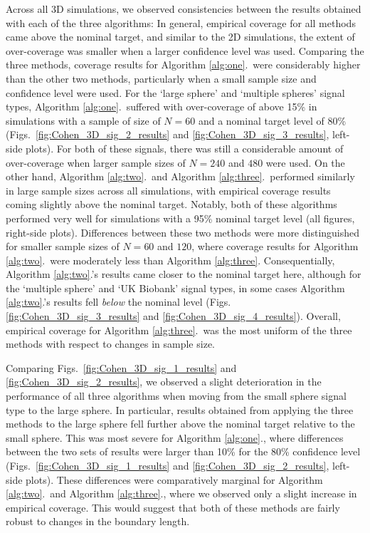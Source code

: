 Across all 3D simulations, we observed consistencies between the results obtained with each of the three algorithms: In general, empirical coverage for all methods came above the nominal target, and similar to the 2D simulations, the extent of over-coverage was smaller when a larger confidence level was used. Comparing the three methods, coverage results for Algorithm \ref{alg:one}.\ were considerably higher than the other two methods, particularly when a small sample size and confidence level were used. For the `large sphere' and `multiple spheres' signal types, Algorithm \ref{alg:one}.\ suffered with over-coverage of above 15\% in simulations with a sample of size of $N = 60$ and a nominal target level of 80\% (Figs.\ \ref{fig:Cohen_3D_sig_2_results} and \ref{fig:Cohen_3D_sig_3_results}, left-side plots). For both of these signals, there was still a considerable amount of over-coverage when larger sample sizes of $N = 240$ and $480$ were used. On the other hand, Algorithm \ref{alg:two}.\ and Algorithm \ref{alg:three}.\ performed similarly in large sample sizes across all simulations, with empirical coverage results coming slightly above the nominal target. Notably, both of these algorithms performed very well for simulations with a 95\% nominal target level (all figures, right-side plots).
Differences between these two methods were more distinguished for smaller sample sizes of $N = 60$ and $120$, where coverage results for Algorithm \ref{alg:two}.\ were moderately less than Algorithm \ref{alg:three}. Consequentially, Algorithm \ref{alg:two}.'s results came closer to the nominal target here, although for the `multiple sphere' and `UK Biobank' signal types, in some cases Algorithm \ref{alg:two}.'s results fell \textit{below} the nominal level (Figs. \ref{fig:Cohen_3D_sig_3_results} and \ref{fig:Cohen_3D_sig_4_results}). Overall, empirical coverage for Algorithm \ref{alg:three}.\ was the most uniform of the three methods with respect to changes in sample size. 

Comparing Figs.\ \ref{fig:Cohen_3D_sig_1_results} and \ref{fig:Cohen_3D_sig_2_results}, we observed a slight deterioration in the performance of all three algorithms when moving from the small sphere signal type to the large sphere. In particular, results obtained from applying the three methods to the large sphere fell further above the nominal target relative to the small sphere. This was most severe for Algorithm \ref{alg:one}., where differences between the two sets of results were larger than 10\% for the 80\% confidence level (Figs.\ \ref{fig:Cohen_3D_sig_1_results} and \ref{fig:Cohen_3D_sig_2_results}, left-side plots). These differences were comparatively marginal for Algorithm \ref{alg:two}.\ and Algorithm \ref{alg:three}., where we observed only a slight increase in empirical coverage. This would suggest that both of these methods are fairly robust to changes in the boundary length.

